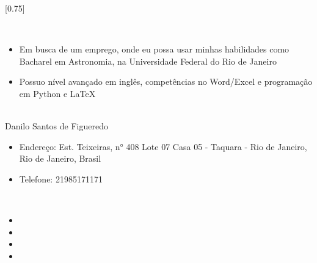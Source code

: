 \documentclass[verylight]{simplehipstercv}
\begin{document}
\setlength{\columnsep}{1.5cm}
[0.75]
\begin{paracol}{2}

\paracolbackgroundoptions



\footnotesize
{\setasidefontcolour
\flushright
\begin{center}
\end{center}

\\[0.5em]

\begin{itemize}
    \item Em busca de um emprego, onde eu possa usar minhas habilidades como Bacharel em Astronomia, na Universidade Federal do Rio de Janeiro
    \item Possuo nível avançado em inglês, competências no Word/Excel e programação em Python e LaTeX


\end{itemize}

\bigskip

 \\[0.5em]
Danilo Santos de Figueredo
\begin{itemize}
    \item Endereço: Est. Teixeiras, n° 408 Lote 07 Casa 05 - Taquara - Rio de Janeiro, Rio de Janeiro, Brasil
    \item Telefone: 21985171171

\end{itemize}



\bigskip

 \\[0.5em]

\begin{itemize}
    \item {}
    \item {}
    \item {}
    \item {} 
\end{itemize}

}
\end{paracol}
\end{document}
